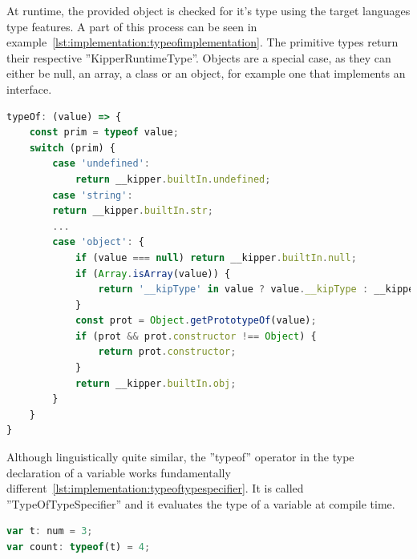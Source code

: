 At runtime, the provided object is checked for it's type using the target languages type features. A part of this process can be seen in example~\ref{lst:implementation:typeofimplementation}. The primitive types return their respective ''KipperRuntimeType''. Objects are a special case, as they can either be null, an array, a class or an object, for example one that implements an interface.

\begin{lstlisting}[language=Typescript,caption=Typeof implementation, label=lst:implementation:typeofimplementation]
typeOf: (value) => {
    const prim = typeof value;
    switch (prim) {
        case 'undefined':
            return __kipper.builtIn.undefined;
        case 'string':
        return __kipper.builtIn.str;
        ...
        case 'object': {
            if (value === null) return __kipper.builtIn.null;
            if (Array.isArray(value)) {
                return '__kipType' in value ? value.__kipType : __kipper.builtIn.Array;
            }
            const prot = Object.getPrototypeOf(value);
            if (prot && prot.constructor !== Object) {
                return prot.constructor;
            }
            return __kipper.builtIn.obj;
        }
    }
}
\end{lstlisting}

Although linguistically quite similar, the ''typeof'' operator in the type declaration of a variable works fundamentally different~\ref{lst:implementation:typeoftypespecifier}. It is called ''TypeOfTypeSpecifier'' and it evaluates the type of a variable at compile time.

\begin{lstlisting}[language=Typescript,caption=TypeOfTypeSpecifier, label=lst:implementation:typeoftypespecifier]
var t: num = 3;
var count: typeof(t) = 4;
\end{lstlisting}


